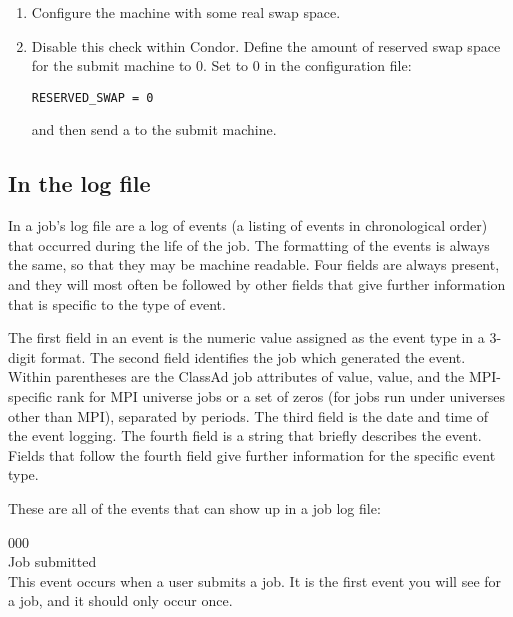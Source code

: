 \begin{enumerate}
\item Configure the machine with some real swap space.

\item Disable this check within Condor.
Define the amount of reserved swap space for the submit machine to 0.
Set  to 0 in the configuration file:

\begin{verbatim}
RESERVED_SWAP = 0
\end{verbatim}

and then send a  to the submit machine.
\end{enumerate}



\subsection{\label{sec:job-log-events}In the log file}
In a job's log file are a log of events (a listing of events in
chronological order) that occurred during the life of the job.
The formatting of the events is always the same, 
so that they may be machine readable.
Four fields are always present,
and they will most often be followed by other fields that give further
information that is specific to the type of event.

The first field in an event is the numeric value assigned as the
event type in a 3-digit format.
The second field identifies the job which generated the event. 
Within parentheses are the ClassAd job attributes of
 value, 
 value, 
and the MPI-specific rank for MPI universe jobs or a set of zeros
(for jobs run under universes other than MPI),
separated by periods.
The third field is the date and time of the event logging.  
The fourth field is a string that briefly describes the event.
Fields that follow the fourth field give further information for the specific
event type.

These are all of the events that can show up in a job log file:

\noindent{} 000 \\
 Job submitted \\
 This event occurs when a user submits a job.
It is the first event you will see for a job, and it should only occur
once. 

